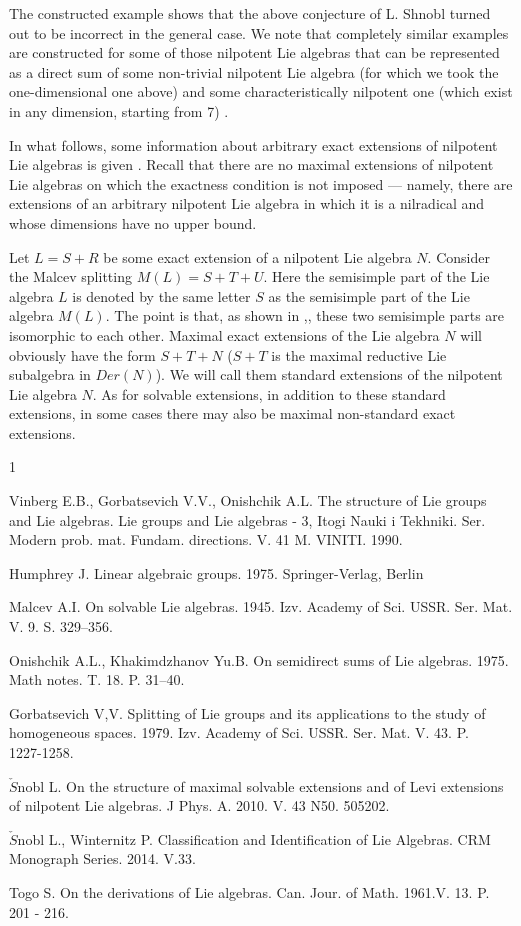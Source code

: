 \documentclass{amsart}
\begin{document}
The constructed example shows that the above conjecture of L. Shnobl turned out to be incorrect in the general case. We note that completely similar examples are constructed for some of those nilpotent Lie algebras that can be represented as a direct sum of some non-trivial nilpotent Lie algebra (for which we took the one-dimensional one above) and some characteristically nilpotent one (which exist in any dimension, starting from 7) .


In what follows, some information  about arbitrary exact extensions of nilpotent Lie algebras is given . Recall that there are no maximal extensions of nilpotent Lie algebras on which the exactness condition is not imposed --- namely, there are extensions of an arbitrary nilpotent Lie algebra in which it is a nilradical and whose dimensions have no upper bound.

Let $L=S+R$ be some exact extension of a nilpotent Lie algebra $N$. Consider the Malcev splitting $M(L)=S+T+U$. Here the semisimple part of the Lie algebra $L$ is denoted by the same letter $S$ as the semisimple part of the Lie algebra $M(L)$. The point is that, as shown in \cite {Ma},\cite {G1}, these two semisimple parts are isomorphic to each other. Maximal exact extensions of the Lie algebra $N$ will obviously have the form $S+T+N$ ($S+T$ is the maximal reductive Lie subalgebra in $Der(N)$). We will call them standard extensions of the nilpotent Lie algebra $N$. As for solvable extensions, in addition to these standard extensions, in some cases there may also be maximal non-standard exact extensions.



\begin{thebibliography}{1}

 Vinberg E.B., Gorbatsevich V.V., Onishchik A.L. The structure of Lie groups and Lie algebras. Lie groups and Lie algebras - 3, Itogi Nauki i Tekhniki. Ser. Modern prob. mat. Fundam. directions. V. 41 M. VINITI. 1990.

 Humphrey J. Linear algebraic groups. 1975. Springer-Verlag, Berlin

 Malcev A.I. On solvable Lie algebras. 1945. Izv. Academy of Sci. USSR. Ser. Mat. V. 9. S. 329--356.


 Onishchik A.L., Khakimdzhanov Yu.B. On semidirect sums of Lie algebras. 1975. Math notes. T. 18. P. 31--40.

 Gorbatsevich V,V. Splitting of Lie groups and its applications to the study of homogeneous spaces. 1979.  Izv. Academy of Sci. USSR. Ser. Mat. V. 43. P. 1227-1258.

 $\check{S}$nobl L. On the structure of maximal solvable extensions and of Levi extensions of nilpotent Lie algebras. J Phys. A. 2010. V. 43 N50. 505202.

 $\check{S}$nobl L., Winternitz P. Classification and Identification of Lie Algebras. CRM Monograph Series. 2014. V.33.


 Togo S. On the derivations of Lie algebras. Can. Jour. of Math. 1961.V. 13. P. 201 - 216.



\end{thebibliography}
\end{document}
